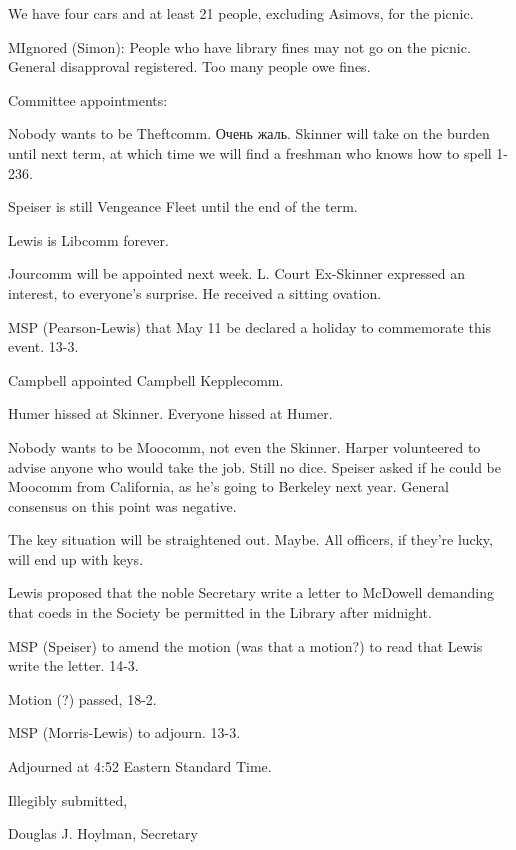 \documentclass[12pt]{article}
\begin{document}
We have four cars and at least 21 people, excluding Asimovs, for the picnic.

MIgnored (Simon): People who have library fines may not go on the picnic. General disapproval registered. Too many people owe fines.

Committee appointments:

Nobody wants to be Theftcomm. Очень жаль. Skinner will take on the burden until next term, at which time we will find a freshman who knows how to spell 1-236.

Speiser is still Vengeance Fleet until the end of the term.

Lewis is Libcomm forever.

Jourcomm will be appointed next week. L. Court Ex-Skinner expressed an interest, to everyone's surprise. He received a sitting ovation.

MSP (Pearson-Lewis) that May 11 be declared a holiday to commemorate this event. 13-3.

Campbell appointed Campbell Kepplecomm.

Humer hissed at Skinner. Everyone hissed at Humer.

Nobody wants to be Moocomm, not even the Skinner. Harper volunteered to advise anyone who would take the job. Still no dice. Speiser asked if he could be Moocomm from California, as he's going to Berkeley next year. General consensus on this point was negative.

The key situation will be straightened out. Maybe. All officers, if they're lucky, will end up with keys.

Lewis proposed that the noble Secretary write a letter to McDowell demanding that coeds in the Society be permitted in the Library after midnight.

MSP (Speiser) to amend the motion (was that a motion?) to read that Lewis write the letter. 14-3.

Motion (?) passed, 18-2.

MSP (Morris-Lewis) to adjourn. 13-3.

Adjourned at 4:52 Eastern Standard Time.

\vspace{12pt}

\centerline{Illegibly submitted,}
\centerline{Douglas J. Hoylman, Secretary}
\end{document}
